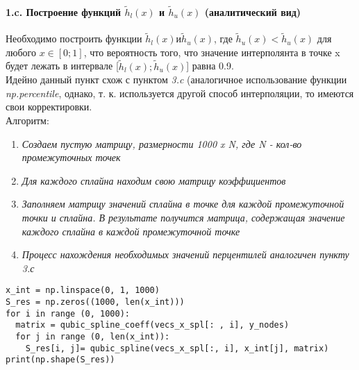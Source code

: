\paragraph{1.c. Построение функций  $\tilde{h}_l(x)$ и $\tilde{h}_u(x)$ (аналитический вид) \\ }
\begin{flushleft}
Необходимо построить функции $\tilde{h}_l(x) и \tilde{h}_u(x)$, где $\tilde{h}_u(x) < \tilde{h}_u(x)$ для любого $x\in[0;1]$, что вероятность того, что значение интерполянта в точке x будет лежать в интервале [$\tilde{h}_l(x);\tilde{h}_u(x)$] равна 0.9.
\\
Идейно данный пункт схож с пунктом \textit{3.c} (аналогичное использование функции \textit{np.percentile}, однако, т. к. используется другой способ интерполяции, то имеются свои корректировки.
\\
Алгоритм:
\begin{enumerate}
	\item \textit{Создаем пустую матрицу, размерности 1000 x N, где N - кол-во промежуточных точек}
	\item \textit{Для каждого сплайна находим свою матрицу коэффициентов}
	\item \textit{Заполняем матрицу значений сплайна в точке для каждой промежуточной точки и сплайна. В результате получится матрица, содержащая значение каждого сплайна в каждой промежуточной точке}
	\item \textit{Процесс нахождения необходимых значений перцентилей аналогичен пункту 3.с}
\end{enumerate}
\end{flushleft}
\begin{lstlisting}
x_int = np.linspace(0, 1, 1000)
S_res = np.zeros((1000, len(x_int)))
for i in range (0, 1000):
  matrix = qubic_spline_coeff(vecs_x_spl[: , i], y_nodes)
  for j in range (0, len(x_int)):
    S_res[i, j]= qubic_spline(vecs_x_spl[:, i], x_int[j], matrix) 
print(np.shape(S_res))
\end{lstlisting}
